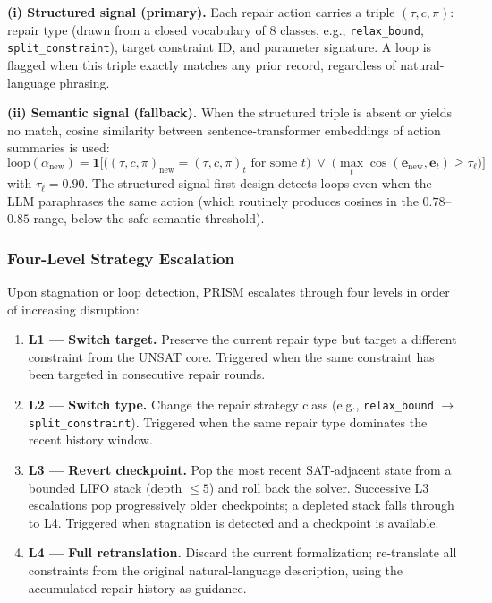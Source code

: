 \textbf{(i) Structured signal (primary).} Each repair action carries a triple $(\tau, c, \pi)$: repair type (drawn from a closed vocabulary of 8 classes, e.g., \texttt{relax\_bound}, \texttt{split\_constraint}), target constraint ID, and parameter signature. A loop is flagged when this triple exactly matches any prior record, regardless of natural-language phrasing.

\textbf{(ii) Semantic signal (fallback).} When the structured triple is absent or yields no match, cosine similarity between sentence-transformer embeddings of action summaries is used:
\[
\text{loop}(\alpha_{\text{new}}) = \mathbf{1}\!\bigl[\bigl((\tau, c, \pi)_{\text{new}} = (\tau, c, \pi)_t \text{ for some }t\bigr)\;\vee\;\bigl(\max_t \cos(\mathbf{e}_{\text{new}}, \mathbf{e}_t) \geq \tau_\ell\bigr)\bigr]
\]
with $\tau_\ell = 0.90$. The structured-signal-first design detects loops even when the LLM paraphrases the same action (which routinely produces cosines in the $0.78$--$0.85$ range, below the safe semantic threshold).

\subsubsection{Four-Level Strategy Escalation}
\label{ssec:escalation}

Upon stagnation or loop detection, PRISM escalates through four levels in order of increasing disruption:

\begin{enumerate}
    \item \textbf{L1 — Switch target.} Preserve the current repair type but target a different constraint from the UNSAT core. Triggered when the same constraint has been targeted in consecutive repair rounds.
    \item \textbf{L2 — Switch type.} Change the repair strategy class (e.g., \texttt{relax\_bound} $\to$ \texttt{split\_constraint}). Triggered when the same repair type dominates the recent history window.
    \item \textbf{L3 — Revert checkpoint.} Pop the most recent SAT-adjacent state from a bounded LIFO stack (depth $\leq 5$) and roll back the solver. Successive L3 escalations pop progressively older checkpoints; a depleted stack falls through to L4. Triggered when stagnation is detected and a checkpoint is available.
    \item \textbf{L4 — Full retranslation.} Discard the current formalization; re-translate all constraints from the original natural-language description, using the accumulated repair history as guidance.
\end{enumerate}

